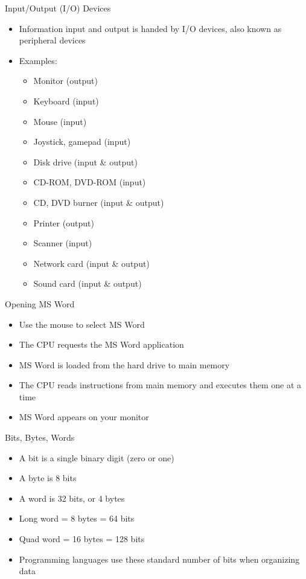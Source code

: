 \documentclass[graphics]{beamer}
\begin{document}
\begin{frame}{Input/Output (I/O) Devices}
    \begin{itemize}
        \item Information input and output is handed by I/O devices, also known as peripheral devices
        \item Examples:
        \begin{itemize}
            \item Monitor (output)
            \item Keyboard (input)
            \item Mouse (input)
            \item Joystick, gamepad (input)
            \item Disk drive (input \& output)
            \item CD-ROM, DVD-ROM (input)
            \item CD, DVD burner (input \& output)
            \item Printer (output)
            \item Scanner (input)
            \item Network card (input \& output)
            \item Sound card (input \& output)
        \end{itemize}
    \end{itemize}
\end{frame}

\begin{frame}{Opening MS Word}
    \begin{itemize}
        \item Use the mouse to select MS Word
        \item The CPU requests the MS Word application
        \item MS Word is loaded from the hard drive to main memory
        \item The CPU reads instructions from main memory and executes them one at a time
        \item MS Word appears on your monitor
    \end{itemize}
\end{frame}

\begin{frame}{Bits, Bytes, Words}
    \begin{itemize}
        \item A bit is a single binary digit (zero or one)
        \item A byte is 8 bits
        \item A word is 32 bits, or 4 bytes
        \item Long word = 8 bytes = 64 bits
        \item Quad word = 16 bytes = 128 bits
        \item Programming languages use these standard number of bits when organizing data
    \end{itemize}
\end{frame}
\end{document}

